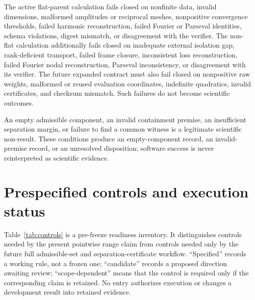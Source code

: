 \documentclass[11pt]{article}
\begin{document}
The active flat-parent calculation fails closed on nonfinite data, invalid dimensions,
malformed amplitudes or reciprocal meshes, nonpositive convergence thresholds, failed
harmonic reconstruction, failed Fourier or Parseval identities, schema violations,
digest mismatch, or disagreement with the verifier. The non-flat calculation
additionally fails closed on inadequate external isolation gap, rank-deficient transport, failed
frame closure, inconsistent loss reconstruction, failed Fourier nodal reconstruction,
Parseval inconsistency, or disagreement with its verifier. The future expanded contract
must also fail closed on nonpositive raw weights, malformed or reused evaluation
coordinates, indefinite quadratics, invalid certificates, and checksum mismatch. Such
failures do not become scientific outcomes.

An empty admissible component, an invalid containment premise, an insufficient
separation margin, or failure to find a common witness is a legitimate scientific
non-result. These conditions produce an empty-component record, an invalid-premise
record, or an unresolved disposition; software success is never reinterpreted as
scientific evidence.

\section{Prespecified controls and execution status}

Table~\ref{tab:controls} is a pre-freeze readiness inventory. It distinguishes controls
needed by the present pointwise range claim from controls needed only by the future full
admissible-set and separation-certificate workflow. ``Specified'' records a working
rule, not a frozen one; ``candidate'' records a proposed direction awaiting review;
``scope-dependent'' means that the control is required only if the corresponding claim
is retained. No entry authorizes execution or changes a development result into retained
evidence.
\end{document}
